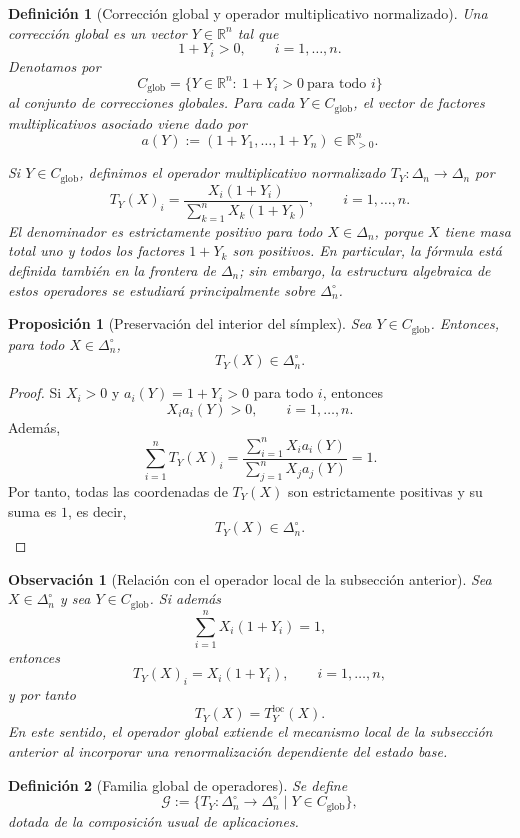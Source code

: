 \documentclass[12pt]{article}
\newtheorem{definicion}{Definición}[section]
\newtheorem{proposicion}{Proposición}[section]
\newtheorem{observacion}{Observación}[section]
\begin{document}
\begin{definicion}[Corrección global y operador multiplicativo normalizado]
\label{def:Cglob}
\label{def:Tglobal}
Una corrección global es un vector $Y\in\mathbb R^n$ tal que
\[
1+Y_i>0,\qquad i=1,\dots,n.
\]
Denotamos por
\[
C_{\mathrm{glob}}
=
\{Y\in\mathbb R^n:\ 1+Y_i>0\ \text{para todo } i\}
\]
al conjunto de correcciones globales. Para cada $Y\in C_{\mathrm{glob}}$, el vector de factores multiplicativos asociado viene dado por
\[
a(Y):=(1+Y_1,\dots,1+Y_n)\in\mathbb{R}_{>0}^n.
\]

Si $Y\in C_{\mathrm{glob}}$, definimos el operador multiplicativo normalizado
$T_Y:\Delta_n\to\Delta_n$ por
\[
T_Y(X)_i
=
\frac{X_i(1+Y_i)}
{\sum_{k=1}^n X_k(1+Y_k)},
\qquad i=1,\dots,n.
\]
El denominador es estrictamente positivo para todo $X\in\Delta_n$, porque
$X$ tiene masa total uno y todos los factores $1+Y_k$ son positivos.
En particular, la fórmula está definida también en la frontera de $\Delta_n$;
sin embargo, la estructura algebraica de estos operadores se estudiará
principalmente sobre $\Delta_n^\circ$.
\end{definicion}
\begin{proposicion}[Preservación del interior del símplex]\label{prop:interiorGlobal}
Sea $Y\in C_{\mathrm{glob}}$. Entonces, para todo $X\in\Delta_n^\circ$,
\[
T_Y(X)\in\Delta_n^\circ.
\]
\end{proposicion}

\begin{proof}
Si $X_i>0$ y $a_i(Y)=1+Y_i>0$ para todo $i$, entonces
\[
X_i a_i(Y)>0,\qquad i=1,\dots,n.
\]
Además,
\[
\sum_{i=1}^n T_Y(X)_i
=
\frac{\sum_{i=1}^n X_i a_i(Y)}{\sum_{j=1}^n X_j a_j(Y)}
=
1.
\]
Por tanto, todas las coordenadas de $T_Y(X)$ son estrictamente positivas y su suma es $1$, es decir,
\[
T_Y(X)\in\Delta_n^\circ.
\]
\end{proof}

\begin{observacion}[Relación con el operador local de la subsección anterior]\label{obs:localVsGlobal}
Sea $X\in\Delta_n^\circ$ y sea $Y\in C_{\mathrm{glob}}$. Si además
\[
\sum_{i=1}^n X_i(1+Y_i)=1,
\]
entonces
\[
T_Y(X)_i=X_i(1+Y_i),\qquad i=1,\dots,n,
\]
y por tanto
\[
T_Y(X)=T_Y^{\mathrm{loc}}(X).
\]
En este sentido, el operador global extiende el mecanismo local de la subsección anterior al incorporar una renormalización dependiente del estado base.
\end{observacion}

\begin{definicion}[Familia global de operadores]\label{def:G}
Se define
\[
\mathcal G
:=
\bigl\{
T_Y:\Delta_n^\circ\to\Delta_n^\circ
\;\big|\;
Y\in C_{\mathrm{glob}}
\bigr\},
\]
dotada de la composición usual de aplicaciones.
\end{definicion}
\end{document}
